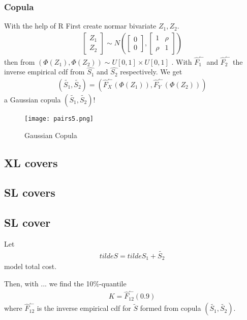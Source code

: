 \documentclass[11pt]{article}
\begin{document}
\subsubsection*{Copula}
With the help of R 
First create normar bivariate $Z_1,Z_2$.
\begin{align} \label{eq:bi1}
	 \begin{bmatrix} Z_1 \\ Z_2\end{bmatrix} \sim N\left(\begin{bmatrix} 0 \\ 0\end{bmatrix},\begin{bmatrix} 1&\rho \\ \rho&1\end{bmatrix}\right)
\end{align}
then from   $\left(\Phi(Z_1),\Phi(Z_2)\right) \sim  U[0,1] \times U[0,1]$ .
With $\hat{F}_1^\leftharpoonup$ and $\hat{F}_2^\leftharpoonup$ the inverse empirical cdf from $\hat{S_1}$ and $\hat{S_2}$ respectively.
We get
\begin{align} \label{eq:bi3}
	  \left(\tilde{S_1},\tilde{S_2}\right) = \left(\hat{F}_X^\leftharpoonup(\Phi(Z_1)),\hat{F}_Y^\leftharpoonup(\Phi(Z_2))\right) 
\end{align}
a Gaussian copula $ \left(\tilde{S_1},\tilde{S_2}\right)$!

 \begin{figure}[H]
 \center
  \texttt{[image: pairs5.png]}
  \caption{Gaussian Copula}
  \label{fig:samplefig5}
\end{figure}

\subsection*{XL covers}

\subsection*{SL covers}

\subsection*{SL cover}
Let
\begin{align*} 
	tilde{S}= tilde{S_1} + \tilde{S_2}
\end{align*}
model total cost.

Then, with ... we find the 10\%-quantile
\begin{align*} 
	K = \hat{F}_{12}^\leftharpoonup(0.9)
\end{align*}
where $\hat{F}_{12}^\leftharpoonup$ is the inverse empirical cdf for $\tilde{S}$  formed from copula $(\tilde{S_1}, \tilde{S_2})$.
\end{document}
